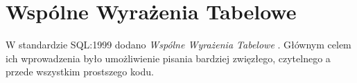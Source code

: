\section{Wspólne Wyrażenia Tabelowe}











W standardzie SQL:1999 dodano \emph{Wspólne Wyrażenia Tabelowe} .
Głównym celem ich wprowadzenia było umożliwienie pisania bardziej zwięzłego, czytelnego a przede wszystkim prostszego kodu.

